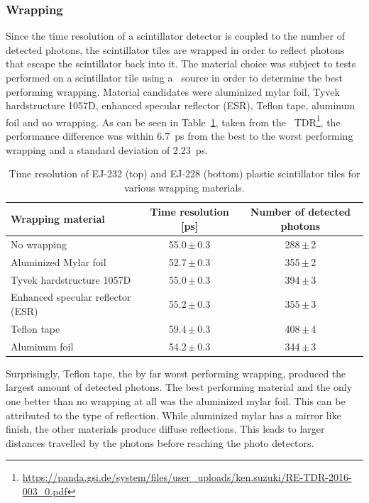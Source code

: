 \documentclass[../BTOF_summary.tex]{subfiles}
\begin{document}
\subsubsection*{Wrapping}
Since the time resolution of a scintillator detector is coupled to the number of detected photons, the scintillator tiles are wrapped in order to reflect photons that escape the scintillator back into it.
The material choice was subject to tests performed on a scintillator tile using a \sr\ source in order to determine the best performing wrapping.
Material candidates were aluminized mylar foil, Tyvek hardstructure 1057D, enhanced specular reflector (ESR), Teflon tape, aluminum foil and no wrapping.
As can be seen in Table~\ref{tab:WrappingTest}, taken from the \btof\ TDR\footnote{\url{https://panda.gsi.de/system/files/user_uploads/ken.suzuki/RE-TDR-2016-003_0.pdf}}, the performance difference was within \SI{6.7}{ps} from the best to the worst performing wrapping and a standard deviation of \SI{2.23}{ps}.

\begin{table}[htbp]
	\caption[Time resolution for different wrapping materials]{Time resolution of EJ-232 (top) and EJ-228 (bottom) plastic scintillator tiles for various wrapping materials.
		\label{tab:WrappingTest}}
	\centering
	{
		\begin{tabular}{ l  c  c }
			\toprule
			Wrapping material                 & Time resolution [ps] & Number of detected photons \\
			\midrule
			No wrapping                       & 55.0\,$\pm$\,0.3     & 288\,$\pm$\,2\\
			Aluminized Mylar foil             & 52.7\,$\pm$\,0.3     & 355\,$\pm$\,2\\
			Tyvek hardstructure 1057D         & 55.0\,$\pm$\,0.3     & 394\,$\pm$\,3\\
			Enhanced specular reflector (ESR) & 55.2\,$\pm$\,0.3     & 355\,$\pm$\,3\\
			Teflon tape                       & 59.4\,$\pm$\,0.3     & 408\,$\pm$\,4\\
			Aluminum foil                     & 54.2\,$\pm$\,0.3     & 344\,$\pm$\,3\\
			\midrule
		\end{tabular}
	}
\end{table}

Surprisingly, Teflon tape, the by far worst performing wrapping, produced the largest amount of detected photons.
The best performing material and the only one better than no wrapping at all was the aluminized mylar foil.
This can be attributed to the type of reflection.
While aluminized mylar has a mirror like finish, the other materials produce diffuse reflections.
This leads to larger distances travelled by the photons before reaching the photo detectors.
\end{document}
